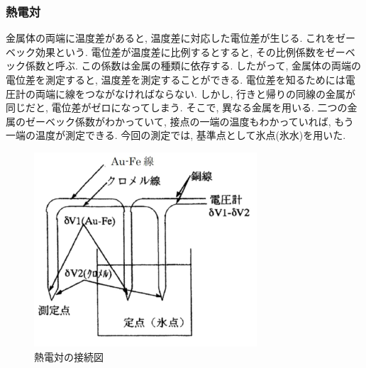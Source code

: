 \documentclass[11pt]{ltjsarticle}
\begin{document}
      \subsubsection*{熱電対}
        金属体の両端に温度差があると, 温度差に対応した電位差が生じる.  これをゼーベック効果という. 電位差が温度差に比例するとすると, その比例係数をゼーベック係数と呼ぶ. この係数は金属の種類に依存する.
        したがって, 金属体の両端の電位差を測定すると, 温度差を測定することができる. 電位差を知るためには電圧計の両端に線をつながなければならない.
        しかし, 行きと帰りの同線の金属が同じだと, 電位差がゼロになってしまう. そこで, 異なる金属を用いる. 二つの金属のゼーベック係数がわかっていて, 接点の一端の温度もわかっていれば, もう一端の温度が測定できる.
        今回の測定では, 基準点として氷点(氷水)を用いた. 
        \begin{figure}[H]
          \centering
          \includegraphics[width=0.6\columnwidth]{netudentui.png}
          \caption{熱電対の接続図}
          \label{fig:netudentui}
        \end{figure}
\end{document}
